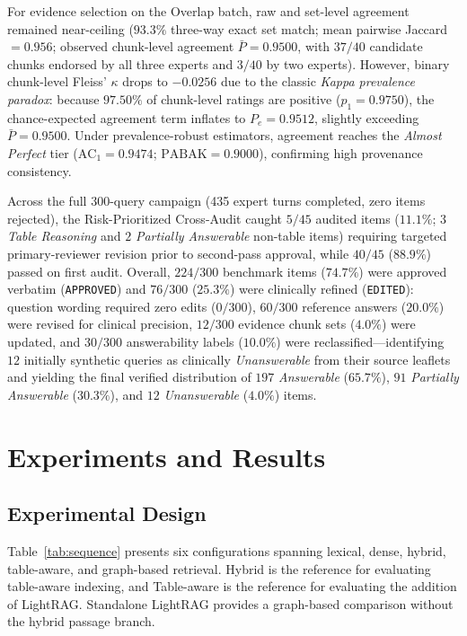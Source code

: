\documentclass[sn-mathphys, oneside]{sn-jnl}
\newcommand{\artifact}[1]{\nolinkurl{#1}}
\begin{document}
For evidence selection on the Overlap batch, raw and set-level agreement remained near-ceiling ($93.3\%$ three-way exact set match; mean pairwise Jaccard $= 0.956$; observed chunk-level agreement $\bar{P} = 0.9500$, with $37/40$ candidate chunks endorsed by all three experts and $3/40$ by two experts). However, binary chunk-level Fleiss' $\kappa$ drops to $-0.0256$ due to the classic \emph{Kappa prevalence paradox}: because $97.50\%$ of chunk-level ratings are positive ($p_1 = 0.9750$), the chance-expected agreement term inflates to $P_e = 0.9512$, slightly exceeding $\bar{P} = 0.9500$. Under prevalence-robust estimators, agreement reaches the \emph{Almost Perfect} tier ($\mathrm{AC}_1 = 0.9474$; $\mathrm{PABAK} = 0.9000$), confirming high provenance consistency.

Across the full 300-query campaign (435 expert turns completed, zero items rejected), the Risk-Prioritized Cross-Audit caught $5/45$ audited items ($11.1\%$; $3$ \emph{Table Reasoning} and $2$ \emph{Partially Answerable} non-table items) requiring targeted primary-reviewer revision prior to second-pass approval, while $40/45$ ($88.9\%$) passed on first audit. Overall, $224/300$ benchmark items ($74.7\%$) were approved verbatim (\artifact{APPROVED}) and $76/300$ ($25.3\%$) were clinically refined (\artifact{EDITED}): question wording required zero edits ($0/300$), $60/300$ reference answers ($20.0\%$) were revised for clinical precision, $12/300$ evidence chunk sets ($4.0\%$) were updated, and $30/300$ answerability labels ($10.0\%$) were reclassified—identifying $12$ initially synthetic queries as clinically \emph{Unanswerable} from their source leaflets and yielding the final verified distribution of $197$ \emph{Answerable} ($65.7\%$), $91$ \emph{Partially Answerable} ($30.3\%$), and $12$ \emph{Unanswerable} ($4.0\%$) items.


\section{Experiments and Results}
\label{sec:experiments}

\subsection{Experimental Design}
Table~\ref{tab:sequence} presents six configurations spanning lexical, dense, hybrid, table-aware, and graph-based retrieval. Hybrid is the reference for evaluating table-aware indexing, and Table-aware is the reference for evaluating the addition of LightRAG. Standalone LightRAG provides a graph-based comparison without the hybrid passage branch.
\end{document}
